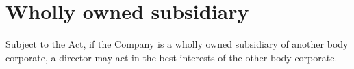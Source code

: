 \section{Wholly owned subsidiary}

Subject to the Act, if the Company is a wholly owned subsidiary of another body corporate, a director may act in the best interests of the other body corporate. 